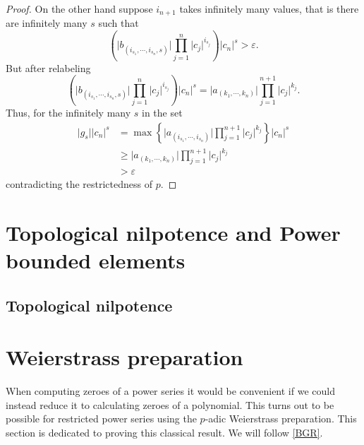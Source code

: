 \begin{proof}
On the other hand suppose $i_{n+1}$ takes infinitely many values, that is there are infinitely many
$s$ such that
\[
  \left( \lvert  b_{(i_{s_1}, \cdots, i_{s_n}, s)} \rvert \prod_{j=1}^{n} \lvert c_j \rvert ^{i_{s_j}} \right) \lvert c_n \rvert^s
  > \varepsilon.
\]
But after relabeling
\[
  \left( \lvert  b_{(i_{s_1}, \cdots, i_{s_n}, s)} \rvert \prod_{j=1}^{n} \lvert c_j \rvert ^{i_{s_j}} \right) \lvert c_n \rvert^s  =
  \lvert  a_{(k_1, \cdots, k_n)} \rvert \prod_{j=1}^{n+1} \lvert c_j \rvert ^{k_j}.
\]
Thus, for the infinitely many $s$ in the set
\begin{align*}
  \lvert g_s \rvert \lvert c_n \rvert^s & = \max \left\{ \lvert  a_{(i_{s_1}, \cdots, i_{s_n})} \rvert
  \prod_{j=1}^{n+1} \lvert c_j \rvert ^{k_j} \right\} \lvert c_n \rvert ^s \\
  & \geq \lvert  a_{(k_1, \cdots, k_n)} \rvert \prod_{j=1}^{n+1} \lvert c_j \rvert ^{k_j} \\
  & > \varepsilon
\end{align*}
contradicting the restrictedness of $p$.
\end{proof}


\chapter{Topological nilpotence and Power bounded elements}

\section{Topological nilpotence}


\chapter{Weierstrass preparation}


When computing zeroes of a power series it would be convenient if we could instead reduce it to
calculating zeroes of a polynomial. This turns out to be possible for restricted power series using
the $p$-adic Weierstrass preparation. This section is dedicated to proving this classical result. We
will follow \ref{BGR}.

